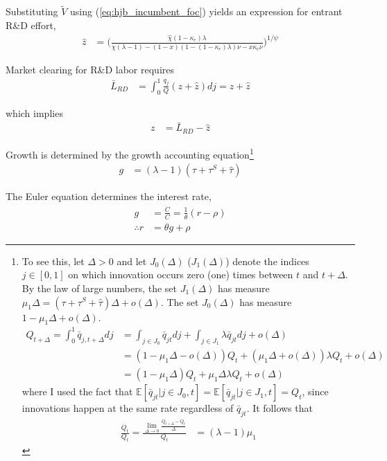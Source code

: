 \documentclass[11pt,english]{article}
\begin{document}
Substituting $\tilde{V}$ using (\ref{eq:hjb_incumbent_foc}) yields an expression for entrant R\&D effort, 
\begin{align}
	\hat{z} &= \Big( \frac{\hat{\chi} (1-\kappa_{e}) \lambda}{\chi(\lambda-1) - (1-x) (1- (1-\kappa_e)\lambda)\nu - x \kappa_{c} \nu} \Big)^{1/\psi} \label{eq:effort_entrant}
\end{align}

Market clearing for R\&D labor requires
\begin{align}
	\bar{L}_{RD} &= \int_0^1 \frac{q_j}{Q} (z + \hat{z}) dj = z + \hat{z} \label{eq:RD_labor_market_clearing}
\end{align}
 
which implies
\begin{align}
	z &= \bar{L}_{RD} - \hat{z} \label{eq:zI_asFuncZe}
\end{align}

Growth is determined by the growth accounting equation\footnote{To see this, let $\Delta > 0$ and let $J_0(\Delta)$ ($J_1(\Delta)$) denote the indices $j\in [0,1]$ on which innovation occurs zero (one) times between $t$ and $t+\Delta$. By the law of large numbers, the set $J_1(\Delta)$ has measure $\mu_1 \Delta = (\tau + \tau^S + \hat{\tau})\Delta + o(\Delta)$. The set $J_0(\Delta)$ has measure $1 - \mu_1 \Delta + o(\Delta)$. 
		\begin{align*}
			Q_{t+\Delta} = \int_0^1 \bar{q}_{j,t+\Delta} dj &= \int_{j \in J_0} \bar{q}_{jt} dj + \int_{j \in J_1} \lambda \bar{q}_{jt} dj + o(\Delta) \\
			&= (1 - \mu_1\Delta - o(\Delta)) Q_t + (\mu_1 \Delta + o(\Delta) ) \lambda Q_t + o(\Delta) \\
			&= (1 - \mu_1\Delta) Q_t + \mu_1\Delta \lambda Q_t + o(\Delta)
 	\end{align*}
 where I used the fact that $\mathbb{E}[\bar{q}_{jt} | j \in J_0, t]  = \mathbb{E}[\bar{q}_{jt} | j \in J_1, t] = Q_t$, since innovations happen at the same rate regardless of $\bar{q}_{jt}$. It follows that
\begin{align*}
	\frac{\dot{Q}_t}{Q_t} = \frac{\lim_{\Delta \to 0} \frac{Q_{t+\Delta} - Q_t}{\Delta}}{Q_t} &= (\lambda - 1)\mu_1 
	\end{align*}}
\begin{align}
g &= (\lambda - 1)(\tau + \tau^S + \hat{\tau}) \label{eq:growth_accounting}
\end{align}

The Euler equation determines the interest rate, 
\begin{align}
	g &= \frac{\dot{C}}{C} = \frac{1}{\theta} (r - \rho) \label{eq:euler} \\
	\therefore r &= \theta g + \rho \label{eq:interest_rate}
\end{align}
\end{document}
